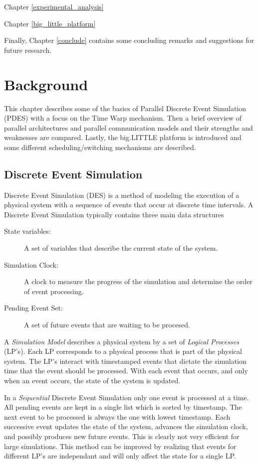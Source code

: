 \documentclass[11pt]{book}
\begin{document}
Chapter \ref{experimental_analysis}

Chapter \ref{big_little_platform}

Finally, Chapter \ref{conclude} contains some concluding remarks and suggestions for future
research.



\chapter{Background}\label{background}

This chapter describes some of the basics of Parallel Discrete Event Simulation (PDES) with
a focus on the Time Warp mechanism. Then a brief overview of parallel architectures and
parallel communication models and their strengths and weaknesses are compared. Lastly, the
big.LITTLE platform is introduced and some different scheduling/switching mechanisms are
described.

\section{Discrete Event Simulation}

Discrete Event Simulation (DES) is a method of modeling the execution of a physical system
with a sequence of events that occur at discrete time intervals. A Discrete Event Simulation
typically contains three main data structures

\begin{description}
    \item[State variables: ] A set of variables that describe the current state of the system.
    \item[Simulation Clock: ] A clock to measure the progress of the simulation and determine
        the order of event processing.
    \item[Pending Event Set: ] A set of future events that are waiting to be procesed.
\end{description}

\noindent
A \emph{Simulation Model} describes a physical system by a set of \emph{Logical Processes}
(LP's). Each LP corresponds to a physical process that is part of the physical system. The
LP's interact with timestamped events that dictate the simulation time that the event should
be processed. With each event that occurs, and only when an event occurs, the state of the
system is updated.

In a \emph{Sequential} Discrete Event Simulation only one event is processed at a time.
All pending events are kept in a single list which is sorted by timestamp. The next event
to be processed is always the one with lowest timestamp. Each successive event updates the
state of the system, advances the simulation clock, and possibly produces new future events.
This is clearly not very efficient for large simulations. This method can be improved by
realizing that events for different LP's are independant and will only affect the state for
a single LP.
\end{document}
